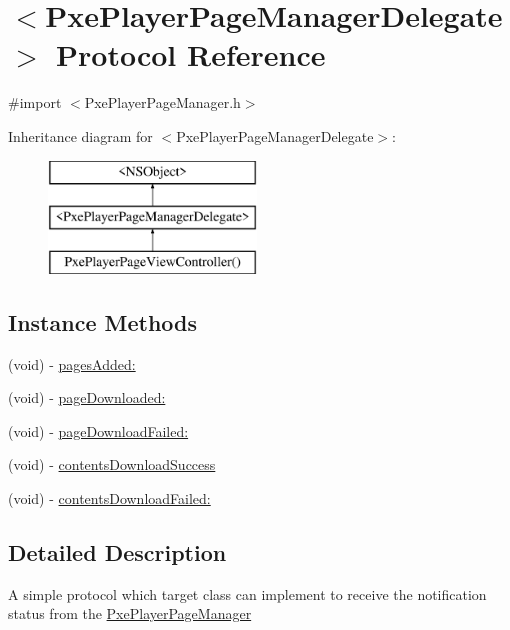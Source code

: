 \hypertarget{protocol_pxe_player_page_manager_delegate-p}{\section{$<$Pxe\-Player\-Page\-Manager\-Delegate$>$ Protocol Reference}
\label{protocol_pxe_player_page_manager_delegate-p}
}


{\ttfamily \#import $<$Pxe\-Player\-Page\-Manager.\-h$>$}

Inheritance diagram for $<$Pxe\-Player\-Page\-Manager\-Delegate$>$\-:\begin{figure}[H]
\begin{center}
\leavevmode
\includegraphics[height=3.000000cm]{protocol_pxe_player_page_manager_delegate-p}
\end{center}
\end{figure}
\subsection*{Instance Methods}
\begin{DoxyCompactItemize}
\item 
(void) -\/ \hyperlink{protocol_pxe_player_page_manager_delegate-p_ab19330eab5624f423791da6812efc0ab}{pages\-Added\-:}
\item 
(void) -\/ \hyperlink{protocol_pxe_player_page_manager_delegate-p_aeb75c84d29e81b0a3ac17767dba10966}{page\-Downloaded\-:}
\item 
(void) -\/ \hyperlink{protocol_pxe_player_page_manager_delegate-p_a005cdc99a2922d6e600f445d467a0862}{page\-Download\-Failed\-:}
\item 
(void) -\/ \hyperlink{protocol_pxe_player_page_manager_delegate-p_a965d42f03bfb8c212f52f871eda34ddd}{contents\-Download\-Success}
\item 
(void) -\/ \hyperlink{protocol_pxe_player_page_manager_delegate-p_a9d9667b05a3d1cccd431612772ff0ec4}{contents\-Download\-Failed\-:}
\end{DoxyCompactItemize}


\subsection{Detailed Description}
A simple protocol which target class can implement to receive the notification status from the \hyperlink{interface_pxe_player_page_manager}{Pxe\-Player\-Page\-Manager} 

